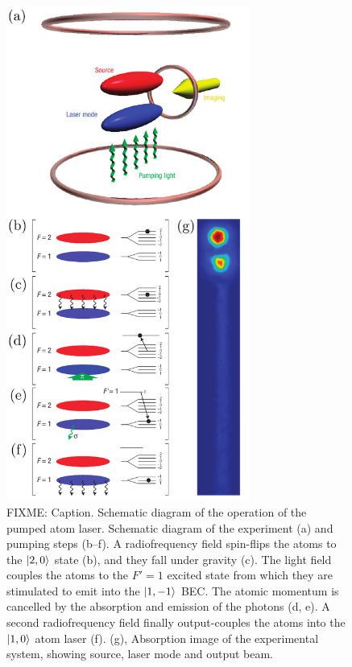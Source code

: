 \begin{figure}
    \centering
    \includegraphics[width=8cm]{ExperimentSchematic}
    \caption{FIXME: Caption.  Schematic diagram of the operation of the pumped atom laser.  Schematic diagram of the experiment (a) and pumping steps (b--f).  A radiofrequency field spin-flips the atoms to the ${\left|2, 0\right>}$ state (b), and they fall under gravity (c).  The light field couples the atoms to the $F'=1$ excited state from which they are stimulated to emit into the ${\left|1, -1\right>}$ BEC.  The atomic momentum is cancelled by the absorption and emission of the photons (d, e).  A second radiofrequency field finally output-couples the atoms into the ${\left|1, 0\right>}$ atom laser (f).  (g), Absorption image of the experimental system, showing source, laser mode and output beam.}
    \label{OpticalPumping:ExperimentSchematic}
\end{figure}

